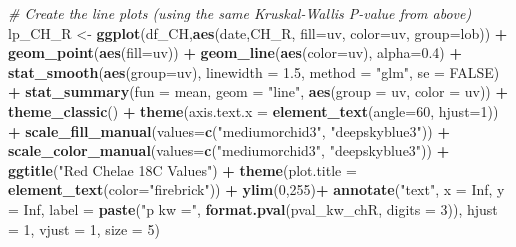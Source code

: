 \documentclass[
]{article}
\newenvironment{Shaded}{\begin{snugshade}}{\end{snugshade}}
\newcommand{\AttributeTok}[1]{\textcolor[rgb]{0.13,0.29,0.53}{#1}}
\newcommand{\CommentTok}[1]{\textcolor[rgb]{0.56,0.35,0.01}{\textit{#1}}}
\newcommand{\ConstantTok}[1]{\textcolor[rgb]{0.56,0.35,0.01}{#1}}
\newcommand{\DecValTok}[1]{\textcolor[rgb]{0.00,0.00,0.81}{#1}}
\newcommand{\FloatTok}[1]{\textcolor[rgb]{0.00,0.00,0.81}{#1}}
\newcommand{\FunctionTok}[1]{\textcolor[rgb]{0.13,0.29,0.53}{\textbf{#1}}}
\newcommand{\NormalTok}[1]{#1}
\newcommand{\OtherTok}[1]{\textcolor[rgb]{0.56,0.35,0.01}{#1}}
\newcommand{\SpecialCharTok}[1]{\textcolor[rgb]{0.81,0.36,0.00}{\textbf{#1}}}
\newcommand{\StringTok}[1]{\textcolor[rgb]{0.31,0.60,0.02}{#1}}
\begin{document}
\begin{Shaded}
\begin{Highlighting}[]
\CommentTok{\# Create the line plots (using the same Kruskal{-}Wallis P{-}value from above)}
\NormalTok{lp\_CH\_R }\OtherTok{\textless{}{-}} \FunctionTok{ggplot}\NormalTok{(df\_CH,}\FunctionTok{aes}\NormalTok{(date,CH\_R, }\AttributeTok{fill=}\NormalTok{uv, }\AttributeTok{color=}\NormalTok{uv, }\AttributeTok{group=}\NormalTok{lob)) }\SpecialCharTok{+}
  \FunctionTok{geom\_point}\NormalTok{(}\FunctionTok{aes}\NormalTok{(}\AttributeTok{fill=}\NormalTok{uv)) }\SpecialCharTok{+} \FunctionTok{geom\_line}\NormalTok{(}\FunctionTok{aes}\NormalTok{(}\AttributeTok{color=}\NormalTok{uv), }\AttributeTok{alpha=}\FloatTok{0.4}\NormalTok{) }\SpecialCharTok{+} 
  \FunctionTok{stat\_smooth}\NormalTok{(}\FunctionTok{aes}\NormalTok{(}\AttributeTok{group=}\NormalTok{uv), }\AttributeTok{linewidth =} \FloatTok{1.5}\NormalTok{, }\AttributeTok{method =} \StringTok{"glm"}\NormalTok{, }\AttributeTok{se =} \ConstantTok{FALSE}\NormalTok{) }\SpecialCharTok{+}
  \FunctionTok{stat\_summary}\NormalTok{(}\AttributeTok{fun =}\NormalTok{ mean, }\AttributeTok{geom =} \StringTok{"line"}\NormalTok{, }\FunctionTok{aes}\NormalTok{(}\AttributeTok{group =}\NormalTok{ uv, }\AttributeTok{color =}\NormalTok{ uv)) }\SpecialCharTok{+}
  \FunctionTok{theme\_classic}\NormalTok{() }\SpecialCharTok{+}
  \FunctionTok{theme}\NormalTok{(}\AttributeTok{axis.text.x =} \FunctionTok{element\_text}\NormalTok{(}\AttributeTok{angle=}\DecValTok{60}\NormalTok{, }\AttributeTok{hjust=}\DecValTok{1}\NormalTok{)) }\SpecialCharTok{+}
  \FunctionTok{scale\_fill\_manual}\NormalTok{(}\AttributeTok{values=}\FunctionTok{c}\NormalTok{(}\StringTok{"mediumorchid3"}\NormalTok{, }\StringTok{"deepskyblue3"}\NormalTok{)) }\SpecialCharTok{+}
  \FunctionTok{scale\_color\_manual}\NormalTok{(}\AttributeTok{values=}\FunctionTok{c}\NormalTok{(}\StringTok{"mediumorchid3"}\NormalTok{, }\StringTok{"deepskyblue3"}\NormalTok{)) }\SpecialCharTok{+}
  \FunctionTok{ggtitle}\NormalTok{(}\StringTok{"Red Chelae 18C Values"}\NormalTok{) }\SpecialCharTok{+} 
  \FunctionTok{theme}\NormalTok{(}\AttributeTok{plot.title =} \FunctionTok{element\_text}\NormalTok{(}\AttributeTok{color=}\StringTok{"firebrick"}\NormalTok{)) }\SpecialCharTok{+}
  \FunctionTok{ylim}\NormalTok{(}\DecValTok{0}\NormalTok{,}\DecValTok{255}\NormalTok{)}\SpecialCharTok{+}
  \FunctionTok{annotate}\NormalTok{(}\StringTok{"text"}\NormalTok{, }\AttributeTok{x =} \ConstantTok{Inf}\NormalTok{, }\AttributeTok{y =} \ConstantTok{Inf}\NormalTok{, }
           \AttributeTok{label =} \FunctionTok{paste}\NormalTok{(}\StringTok{"p kw ="}\NormalTok{, }\FunctionTok{format.pval}\NormalTok{(pval\_kw\_chR, }\AttributeTok{digits =} \DecValTok{3}\NormalTok{)),}
           \AttributeTok{hjust =} \DecValTok{1}\NormalTok{, }\AttributeTok{vjust =} \DecValTok{1}\NormalTok{, }\AttributeTok{size =} \DecValTok{5}\NormalTok{)}


\end{Highlighting}
\end{Shaded}
\end{document}
